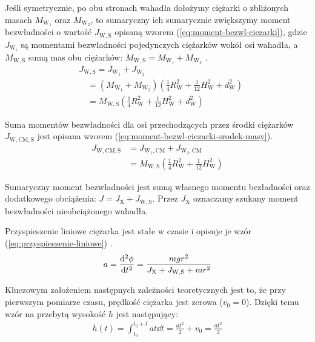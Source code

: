 \documentclass[twocolumn, a4paper, polish, 10pt]{article}
\newcommand{\JX}{\ensuremath{ J_{\mathrm{X}} }}
\newcommand{\JWS}{\ensuremath{ J_{\mathrm{W,S}} }}
\newcommand{\JwCmS}{\ensuremath{ J_{\mathrm{W,CM,S}} }}
\newcommand{\MWS}{\ensuremath{ M_{\mathrm{W,S}} }}
\begin{document}
Jeśli symetrycznie, po obu stronach wahadła dołożymy ciężarki o zbliżonych masach $M_\mathrm{W_1}$ oraz $M_\mathrm{W_2}$, to sumaryczny ich sumarycznie zwiększymy moment bezwładności o wartość $\JWS$ opisaną wzorem (\ref{eq:moment-bezwl-ciezarki}), gdzie $J_{\mathrm{W}_i}$ są momentami bezwładności pojedynczych ciężarków wokół osi wahadła, a $\MWS$ sumą mas obu ciężarków:
$\MWS = M_\mathrm{W_1} + M_\mathrm{W_2}$ \cite{pracownia-fizyczna-m7}.
\begin{equation}
\begin{split}
    &\JWS = J_{\mathrm{W_1}} + J_{\mathrm{W_2}} \\
    &\quad = \left(
        M_\mathrm{W_1} + M_\mathrm{W_2}
    \right) \left(
        \frac{1}{4} R_\mathrm{W}^2 + \frac{1}{12} H_\mathrm{W}^2 + d_\mathrm{W}^2
    \right) \\
    &\quad = \MWS \left(
        \frac{1}{4} R_\mathrm{W}^2 + \frac{1}{12} H_\mathrm{W}^2 + d_\mathrm{W}^2
    \right)
\label{eq:moment-bezwl-ciezarki}
\end{split}
\end{equation}

Suma momentów bezwładności dla osi przechodzących przez środki ciężarków $\JwCmS$ jest opisana wzorem (\ref{eq:moment-bezwl-ciezarki-srodek-masy}).
\begin{equation}
\begin{split}
    \JwCmS &= J_{\mathrm{W_1,CM}} + J_{\mathrm{W_2,CM}} \\
    &= \MWS \left(
        \frac{1}{4} R_\mathrm{W}^2 + \frac{1}{12} H_\mathrm{W}^2
    \right)
\label{eq:moment-bezwl-ciezarki-srodek-masy}
\end{split}
\end{equation}

Sumaryczny moment bezwładności jest sumą własnego momentu bezładności oraz dodatkowego obciążenia:
$J = \JX + \JWS$.
Przez $\JX$ oznaczamy szukany moment bezwładności nieobciążonego wahadła.

Przyspieszenie liniowe ciężarka jest stałe w czasie i opisuje je wzór (\ref{eq:przyspieszenie-liniowe}) \cite{pracownia-fizyczna-m7}.
\begin{equation}
\begin{split}
    a = \dv[2]{\phi}{t} = \frac{mgr^2}{\JX + \JWS + mr^2}
\label{eq:przyspieszenie-liniowe}
\end{split}
\end{equation}

Kluczowym założeniem następnych zależności teoretycznych jest to, że przy pierwszym pomiarze czasu, prędkość ciężarka jest zerowa ($v_0 = 0$).
Dzięki temu wzór na przebytą wysokość $h$ jest następujący:
\begin{equation}
\begin{split}
    h(t) = \int_{t_0}^{t_0 + t} at \dd{t} = \frac{a t^2}{2} + v_0 = \frac{a t^2}{2}
\label{eq:przebyta-wysokosc}
\end{split}
\end{equation}
\end{document}

